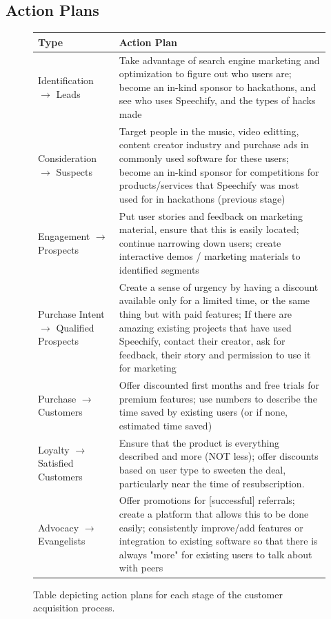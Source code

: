 \documentclass{article}
\begin{document}
    \subsection{Action Plans}
        \begin{figure}[h!]
            \begin{center}
                
                \begin{tabular}{| p{4.2cm} | p{9cm} |}
                    \hline
                    \textbf{Type} & \textbf{Action Plan} \\
                    \hline
                    Identification $\rightarrow$ Leads & Take advantage of search engine marketing and optimization to figure out who users are; become an in-kind sponsor to hackathons, and see who uses Speechify, and the types of hacks made  \\
                    \hline
                    Consideration $\rightarrow$ Suspects & Target people in the music, video editting, content creator industry and purchase ads in commonly used software for these users; become an in-kind sponsor for competitions for products/services that Speechify was most used for in hackathons (previous stage)  \\
                    \hline
                    Engagement $\rightarrow$ Prospects & Put user stories and feedback on marketing material, ensure that this is easily located; continue narrowing down users; create interactive demos / marketing materials to identified segments \\
                    \hline
                    Purchase Intent $\rightarrow$ Qualified Prospects & Create a sense of urgency by having a discount available only for a limited time, or the same thing but with paid features; If there are amazing existing projects that have used Speechify, contact their creator, ask for feedback, their story and permission to use it for marketing \\
                    \hline
                    Purchase $\rightarrow$ Customers & Offer discounted first months and free trials for premium features; use numbers to describe the time saved by existing users (or if none, estimated time saved) \\
                    \hline
                    Loyalty $\rightarrow$ Satisfied Customers & Ensure that the product is everything described and more (NOT less); offer discounts based on user type to sweeten the deal, particularly near the time of resubscription. \\
                    \hline
                    Advocacy $\rightarrow$ Evangelists & Offer promotions for [successful] referrals; create a platform that allows this to be done easily; consistently improve/add features or integration to existing software so that there is always "more" for existing users to talk about with peers\\
                    \hline
                \end{tabular}
                \caption{Table depicting action plans for each stage of the customer acquisition process.}
            \end{center}
            \end{figure}
\end{document}
